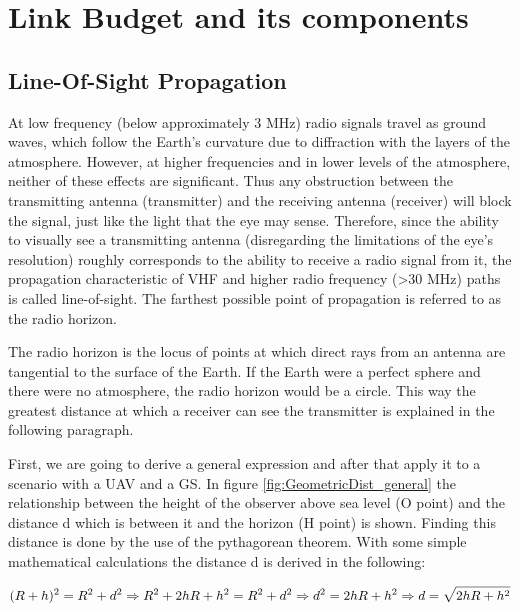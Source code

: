 \section{Link Budget and its components}\label{sec:link_budget}

\subsection{Line-Of-Sight Propagation}\label{subsec:los_propagation}
At low frequency (below approximately 3 MHz) radio signals travel as ground waves, which follow the Earth's curvature due to diffraction with the layers of the atmosphere.
However, at higher frequencies and in lower levels of the atmosphere, neither of these effects are significant. Thus any obstruction between the transmitting antenna (transmitter) and the receiving antenna (receiver) will block the signal, just like the light that the eye may sense. Therefore, since the ability to visually see a transmitting antenna (disregarding the limitations of the eye's resolution) roughly corresponds to the ability to receive a radio signal from it, the propagation characteristic of VHF and higher radio frequency (>30 MHz) paths is called line-of-sight. The farthest possible point of propagation is referred to as the radio horizon.

The radio horizon is the locus of points at which direct rays from an antenna are tangential to the surface of the Earth. If the Earth were a perfect sphere and there were no atmosphere, the radio horizon would be a circle.
This way the greatest distance at which a receiver can see the transmitter is explained in the following paragraph.

First, we are going to derive a general expression and after that apply it to a scenario with a UAV and a GS. In figure  \ref{fig:GeometricDist_general} the relationship between the height of the observer above sea level (O point) and the distance d which is between it and the horizon (H point) is shown. Finding this distance is done by the use of the pythagorean theorem. With some simple mathematical calculations the distance d is derived in the following:

\begin{equation}\label{eq:los_distToHorizon}
	(R+h)^2 = R^2+d^2\nonumber \\
	\Rightarrow R^2+2hR+h^2 = R^2+d^2 \Rightarrow d^2 = 2hR + h^2 \\
	\Rightarrow d = \sqrt{2hR + h^2}
\end{equation} 

